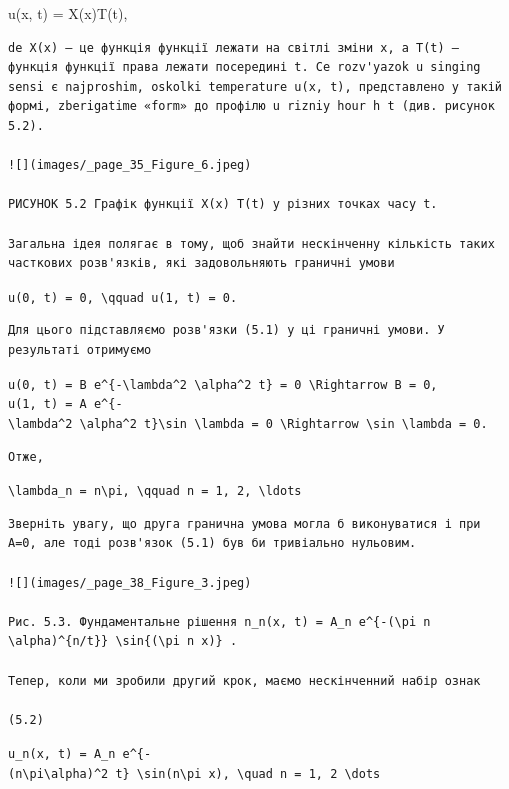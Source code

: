 \documentclass[
  ukrainian,
]{article}
\begin{document}
u(x, t) = X(x)T(t),

\begin{verbatim}
de X(x) — це функція функції лежати на світлі зміни x, а T(t) — функція функції права лежати посередині t. Ce rozv'yazok u singing sensi є najproshim, oskolki temperature u(x, t), представлено у такій формі, zberigatime «form» до профілю u rizniy hour h t (див. рисунок 5.2).

![](images/_page_35_Figure_6.jpeg)

РИСУНОК 5.2 Графік функції X(x) T(t) у різних точках часу t.

Загальна ідея полягає в тому, щоб знайти нескінченну кількість таких часткових розв'язків, які задовольняють граничні умови
\end{verbatim}

\texttt{u(0,\ t)\ =\ 0,\ \textbackslash{}qquad\ u(1,\ t)\ =\ 0.}

\begin{verbatim}
Для цього підставляємо розв'язки (5.1) у ці граничні умови. У результаті отримуємо
\end{verbatim}

\texttt{u(0,\ t)\ =\ B\ e\^{}\{-\textbackslash{}lambda\^{}2\ \textbackslash{}alpha\^{}2\ t\}\ =\ 0\ \textbackslash{}Rightarrow\ B\ =\ 0,}
\texttt{u(1,\ t)\ =\ A\ e\^{}\{-\textbackslash{}lambda\^{}2\ \textbackslash{}alpha\^{}2\ t\}\textbackslash{}sin\ \textbackslash{}lambda\ =\ 0\ \textbackslash{}Rightarrow\ \textbackslash{}sin\ \textbackslash{}lambda\ =\ 0.}

\begin{verbatim}
Отже,
\end{verbatim}

\texttt{\textbackslash{}lambda\_n\ =\ n\textbackslash{}pi,\ \textbackslash{}qquad\ n\ =\ 1,\ 2,\ \textbackslash{}ldots}

\begin{verbatim}
Зверніть увагу, що друга гранична умова могла б виконуватися і при A=0, але тоді розв'язок (5.1) був би тривіально нульовим.

![](images/_page_38_Figure_3.jpeg)

Рис. 5.3. Фундаментальне рішення n_n(x, t) = A_n e^{-(\pi n \alpha)^{n/t}} \sin{(\pi n x)} .

Тепер, коли ми зробили другий крок, маємо нескінченний набір ознак

(5.2)
\end{verbatim}

\texttt{u\_n(x,\ t)\ =\ A\_n\ e\^{}\{-(n\textbackslash{}pi\textbackslash{}alpha)\^{}2\ t\}\ \textbackslash{}sin(n\textbackslash{}pi\ x),\ \textbackslash{}quad\ n\ =\ 1,\ 2\ \textbackslash{}dots}
\end{document}
